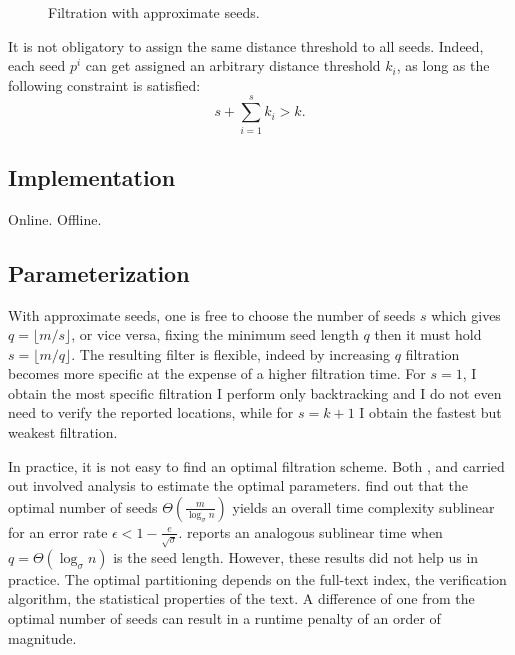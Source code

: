 \begin{figure}[h]
\begin{center}
\caption[Filtration with approximate seeds]{Filtration with approximate seeds.}
\label{fig:seeds-apx}

\end{center}
\end{figure}

It is not obligatory to assign the same distance threshold to all seeds.
Indeed, each seed $p^i$ can get assigned an arbitrary distance threshold $k_i$, as long as the following constraint is satisfied:
\begin{equation}
s + \sum_{i=1}^{s}{k_i} > k.
\end{equation}

\subsection{Implementation}

Online.
Offline.

\subsection{Parameterization}

With approximate seeds, one is free to choose the number of seeds $s$ which gives $q =\lfloor m/s \rfloor$, or vice versa, fixing the minimum seed length $q$ then it must hold $s = \lfloor m/q \rfloor$.
The resulting filter is flexible, indeed by increasing $q$ filtration becomes more specific at the expense of a higher filtration time.
For $s=1$, I obtain the most specific filtration \ie I perform only backtracking and I do not even need to verify the reported locations, while for $s=k+1$ I obtain the fastest but weakest filtration.

In practice, it is not easy to find an optimal filtration scheme.
Both \citeauthor{Myers1994}, and \citeauthor{Navarro2000} carried out involved analysis to estimate the optimal parameters. \citeauthor{Navarro2000} find out that the optimal number of seeds $\Theta(\frac{m}{\log_{\sigma}{n}})$ yields an overall time complexity sublinear for an error rate $\epsilon < 1 - \frac{e}{\sqrt{\sigma}}$.
\citeauthor{Myers1994} reports an analogous sublinear time when $q=\Theta(\log_{\sigma}{n})$ is the seed length.
However, these results did not help us in practice.
The optimal partitioning depends on the full-text index, the verification algorithm, the statistical properties of the text.
A difference of one from the optimal number of seeds can result in a runtime penalty of an order of magnitude.

